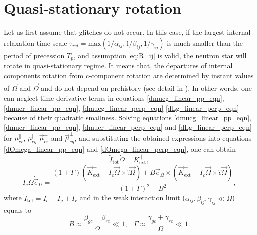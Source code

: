 \documentclass[a4paper]{jpconf}
\begin{document}
  \section{Quasi-stationary rotation}
    Let us first assume that glitches do not occur.
    In this case, if the largest internal relaxation time-scale $\tau_{rel} = {\mathrm{max}}\left( 1 /\alpha_{ij}, 1/\beta_{ij}, 1/\gamma_{ij} \right)$ is much smaller than the period of precession $T_p$, and assumption \eqref{eq:R_ij} is valid,
    the neutron star will rotate in quasi-stationary regime. 
    It means that,
    the departures of internal components rotation from c-component rotation are
    determined by instant values of $\vec{\Omega}$ and $\dot{\vec{\Omega}}$ and do not depend on prehistory (see detail in \cite{BGT2013}). In other words, one can neglect time derivative terms in equations \eqref{dmucg_linear_pp_eqn}, \eqref{dmucr_linear_pp_eqn}, \eqref{dmucg_linear_perp_eqn}-\eqref{dLg_linear_perp_eqn} because of their quadratic smallness.
    Solving equations \eqref{dmucg_linear_pp_eqn}, \eqref{dmucr_linear_pp_eqn}, \eqref{dmucr_linear_perp_eqn} and \eqref{dLg_linear_perp_eqn} for $\mu_{cr}^{||}$, $\mu_{cg}^{||}$ $\vec{\mu}_{cr}^{\perp}$ and $\vec{\mu}_{cg}^{\perp}$, and substituting the obtained expressions into equations \eqref{dOmega_linear_pp_eqn} and \eqref{dOmega_linear_perp_eqn}, one can obtain
    \begin{equation}
      \label{eq:retard}
      \tilde{I}_\mathrm{tot}\dot{\Omega} = K_\mathrm{ext}^{||},
    \end{equation}
    \begin{equation}
      \label{eq:precess}
      I_c \Omega \dot{\vec{e}}_{\Omega} =\frac{(1+\Gamma)(\vec{K}_\mathrm{ext}^\perp-I_c\vec{\Omega}\times\hat{\epsilon}\vec{\Omega})+B\vec{e}_\Omega\times(\vec{K}_\mathrm{ext}^\perp-I_c\vec{\Omega}\times\hat{\epsilon}\vec{\Omega})}{(1+\Gamma)^2+B^2},
    \end{equation}
    where $\tilde{I}_\mathrm{tot} = I_c + I_g + I_r$
    and 
    in the weak interaction limit  ($\alpha_{ij}, \beta_{ij},\gamma_{ij} \ll \Omega$) equals to
    \begin{equation}
      \label{eq:precess_coeffs_weak_limit}
      B \approx \frac{\beta_{gc} + \beta_{rc}}{\Omega} \ll 1, \ \ \ \ \Gamma \approx \frac{\gamma_{gc} + \gamma_{rc}}{\Omega} \ll 1.
    \end{equation}
    
\end{document}

